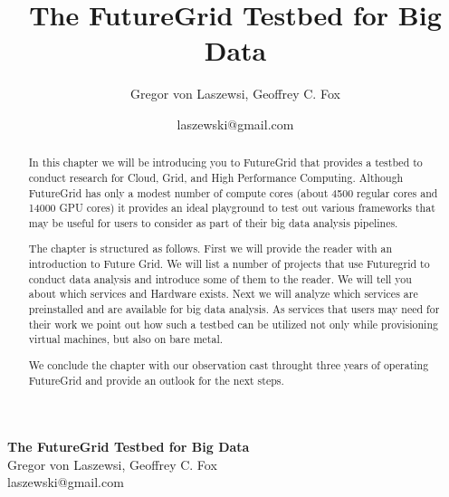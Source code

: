 \documentclass{article}
\makeatletter
\newcommand{\TITLE}{The FutureGrid Testbed for Big Data}
\newcommand{\AUTHOR}{Gregor von Laszewsi, Geoffrey C. Fox}
\newcommand{\EMAIL}{laszewski@gmail.com}
\makeatother
\begin{document}
\title{\TITLE}
\author{\AUTHOR}
\date{\EMAIL}




\begin{center}
{\Large\bf \TITLE}\\
{\AUTHOR}\\
{\EMAIL}
\end{center}

\tableofcontents

\newpage


\listoftodos

\newpage



\maketitle



\begin{abstract}

In this chapter we will be introducing you to FutureGrid that provides a testbed to conduct research for Cloud, Grid, and High Performance Computing. Although FutureGrid has only a modest number of compute cores (about 4500 regular cores and 14000 GPU cores) it provides an ideal playground to test out various frameworks that may be useful for users to consider as part of their big data analysis pipelines. 

The chapter is structured as follows. First we will provide the reader with an introduction to Future Grid. We will list a number of projects that use Futuregrid to conduct data analysis and introduce some of them to the reader. We will tell you about which services and Hardware exists. Next we will analyze which services are preinstalled and are available for big data analysis. As services that users may need for their work we point out how such a testbed can be utilized not only while provisioning virtual machines, but also on bare metal. 

We conclude the chapter with our observation cast throught three years of operating FutureGrid and provide an outlook for the next steps.
\end{abstract}
\end{document}
